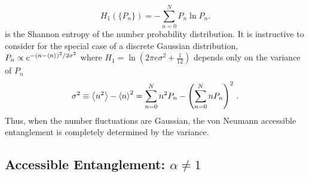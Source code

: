 %
\begin{equation}
    H_1(\{P_n\}) = -\sum_{n=0}^N P_n \ln P_n.
\label{eq:H1}
\end{equation}
%
is the Shannon entropy of the number probability distribution.  It is instructive to consider  for the special case of a discrete Gaussian distribution, $P_n \propto e^{-(n-\expval{n})^2/2\sigma^2}$ where $H_1 = \ln\left(2\pi e \sigma^2 + \tfrac{1}{12}\right)$ depends only on the variance of $P_n$
%
\begin{equation}
    \sigma^2 \equiv \expval{n^2}-\expval{n}^2 = \sum_{n=0}^N n^2 P_n  - \left(\sum_{n=0}^N n P_n\right)^2\,.
\label{eq:sigma2}
\end{equation}
%
Thus, when the number fluctuations are Gaussian, the von Neumann accessible entanglement is completely determined by the variance.

\subsection{\ren Accessible Entanglement: $\alpha \ne 1$}


